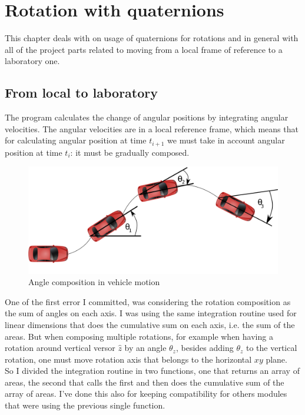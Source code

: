 \chapter{Rotation with quaternions}
\label{chap:rotation_with_quaternions}

This chapter deals with on usage of quaternions for rotations and in general with all of the project parts related to moving from a local frame of reference to a laboratory one.

\section{From local to laboratory}
The program calculates the change of angular positions by integrating angular velocities. The angular velocities are in a local reference frame, which means that for calculating angular position at time $t_{i+1}$ we must take in account angular position at time $t_i$: it must be gradually composed.\\
\begin{figure}[H]
\includegraphics[width=\textwidth]{angle_composition.png}
\caption{Angle composition in vehicle motion}
\end{figure}
\justify
One of the first error I committed, was considering the rotation composition as the sum of angles on each axis. I was using the same integration routine used for linear dimensions that does the cumulative sum on each axis, i.e. the sum of the areas. But when composing multiple rotations, for example when having a rotation around vertical versor $\hat{z}$ by an angle $\theta_z$, besides adding $\theta_z$ to the vertical rotation, one must move rotation axis that belongs to the horizontal $xy$ plane. \\
So I divided the integration routine in two functions, one that returns an array of areas, the second that calls the first and then does the cumulative sum of the array of areas. I've done this also for keeping compatibility for others modules that were using the previous single function. \\
